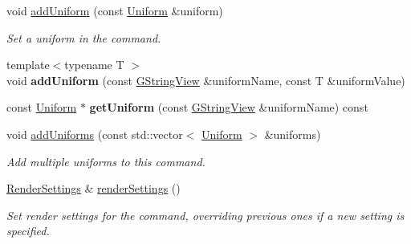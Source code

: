 \begin{Indent}
\begin{DoxyCompactItemize}
\mbox{\label{classrev_1_1_draw_command_a216aad6b1b1ae931a661ebf94b6b72da}} 
void \mbox{\hyperlink{classrev_1_1_draw_command_a216aad6b1b1ae931a661ebf94b6b72da}{add\+Uniform}} (const \mbox{\hyperlink{structrev_1_1_uniform}{Uniform}} \&uniform)
\begin{DoxyCompactList}\small\item\em Set a uniform in the command. \end{DoxyCompactList}\item 
\mbox{\label{classrev_1_1_draw_command_a91ce14653726f901ffecda9533d825e2}} 
{\footnotesize template$<$typename T $>$ }\\void {\bfseries add\+Uniform} (const \mbox{\hyperlink{classrev_1_1_g_string_view}{G\+String\+View}} \&uniform\+Name, const T \&uniform\+Value)
\item 
\mbox{\label{classrev_1_1_draw_command_a05c44b5b93bb393e5d136fac3f832ee3}} 
const \mbox{\hyperlink{structrev_1_1_uniform}{Uniform}} $\ast$ {\bfseries get\+Uniform} (const \mbox{\hyperlink{classrev_1_1_g_string_view}{G\+String\+View}} \&uniform\+Name) const
\item 
\mbox{\label{classrev_1_1_draw_command_a00b016a976baa9e010327bb1d4c378b2}} 
void \mbox{\hyperlink{classrev_1_1_draw_command_a00b016a976baa9e010327bb1d4c378b2}{add\+Uniforms}} (const std\+::vector$<$ \mbox{\hyperlink{structrev_1_1_uniform}{Uniform}} $>$ \&uniforms)
\begin{DoxyCompactList}\small\item\em Add multiple uniforms to this command. \end{DoxyCompactList}\item 
\mbox{\label{classrev_1_1_draw_command_a75a5681efc6b3e7a2b62031b9fbd34ab}} 
\mbox{\hyperlink{classrev_1_1_render_settings}{Render\+Settings}} \& \mbox{\hyperlink{classrev_1_1_draw_command_a75a5681efc6b3e7a2b62031b9fbd34ab}{render\+Settings}} ()
\begin{DoxyCompactList}\small\item\em Set render settings for the command, overriding previous ones if a new setting is specified. \end{DoxyCompactList}\item 

\end{DoxyCompactItemize}
\end{Indent}
